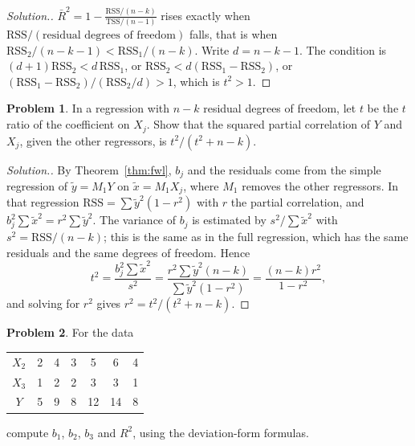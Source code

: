 \documentclass[11pt,a4paper]{article}
\numberwithin{equation}{section}
\theoremstyle{definition}
\newtheorem{problemx}{Problem}[subsection]
\newenvironment{problem}{\begin{problemx}}{\end{problemx}}
\newenvironment{solution}
  {\renewcommand{\qedsymbol}{}\begin{proof}[\textit{Solution}.]}
  {\end{proof}}
\begin{document}
\begin{solution}
$\bar R^2 = 1 - \frac{\text{RSS}/(n - k)}{\text{TSS}/(n - 1)}$ rises exactly when $\text{RSS}/(\text{residual degrees of freedom})$ falls, that is when
$\text{RSS}_2/(n - k - 1) < \text{RSS}_1/(n - k)$. Write $d = n - k - 1$. The condition is $(d + 1)\text{RSS}_2 < d\,\text{RSS}_1$, or
$\text{RSS}_2 < d(\text{RSS}_1 - \text{RSS}_2)$, or $(\text{RSS}_1 - \text{RSS}_2)/(\text{RSS}_2/d) > 1$, which is $t^2 > 1$.
\end{solution}

\begin{problem}
\label{prob:tpartial}
In a regression with $n - k$ residual degrees of freedom, let $t$ be the $t$ ratio of the coefficient on $X_j$. Show that the squared partial
correlation of $Y$ and $X_j$, given the other regressors, is $t^2/(t^2 + n - k)$.
\end{problem}

\begin{solution}
By Theorem~\ref{thm:fwl}, $b_j$ and the residuals come from the simple regression of $\tilde y = M_1Y$ on $\tilde x = M_1X_j$, where $M_1$ removes the other
regressors. In that regression $\text{RSS} = \sum\tilde y^2(1 - r^2)$ with $r$ the partial correlation, and $b_j^2\sum\tilde x^2 = r^2\sum\tilde y^2$. The variance of
$b_j$ is estimated by $s^2/\sum\tilde x^2$ with $s^2 = \text{RSS}/(n - k)$; this is the same as in the full regression, which has the same residuals and the same
degrees of freedom. Hence
\[
t^2 = \frac{b_j^2\sum\tilde x^2}{s^2} = \frac{r^2\sum\tilde y^2(n - k)}{\sum\tilde y^2(1 - r^2)} = \frac{(n - k)r^2}{1 - r^2},
\]
and solving for $r^2$ gives $r^2 = t^2/(t^2 + n - k)$.
\end{solution}

\begin{problem}
For the data
\begin{center}
\begin{tabular}{c|cccccc}
$X_2$ & 2 & 4 & 3 & 5 & 6 & 4\\
$X_3$ & 1 & 2 & 2 & 3 & 3 & 1\\
$Y$ & 5 & 9 & 8 & 12 & 14 & 8
\end{tabular}
\end{center}
compute $b_1$, $b_2$, $b_3$ and $R^2$, using the deviation-form formulas.
\end{problem}
\end{document}
